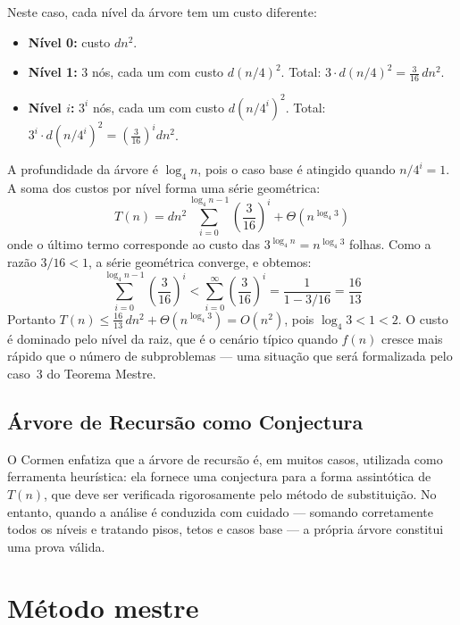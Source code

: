 \documentclass[9pt,a4paper]{extarticle}
\begin{document}
\noindent Neste caso, cada nível da árvore tem um custo diferente:

\begin{itemize}
    \item \textbf{Nível 0:} custo $dn^2$.
    \item \textbf{Nível 1:} $3$ nós, cada um com custo $d(n/4)^2$. Total: $3 \cdot d(n/4)^2 = \frac{3}{16}\,dn^2$.
    \item \textbf{Nível $i$:} $3^i$ nós, cada um com custo $d(n/4^i)^2$. Total: $3^i \cdot d(n/4^i)^2 = \left(\frac{3}{16}\right)^i dn^2$.
\end{itemize}

\noindent A profundidade da árvore é $\log_4 n$, pois o caso base é atingido quando $n/4^i = 1$. A soma dos custos por nível forma uma série geométrica:
%
\[
T(n) = dn^2 \sum_{i=0}^{\log_4 n - 1} \left(\frac{3}{16}\right)^i + \Theta\!\left(n^{\log_4 3}\right)
\]
%
\noindent onde o último termo corresponde ao custo das $3^{\log_4 n} = n^{\log_4 3}$ folhas. Como a razão $3/16 < 1$, a série geométrica converge, e obtemos:
%
\[
\sum_{i=0}^{\log_4 n - 1} \left(\frac{3}{16}\right)^i < \sum_{i=0}^{\infty} \left(\frac{3}{16}\right)^i = \frac{1}{1 - 3/16} = \frac{16}{13}
\]
%
\noindent Portanto $T(n) \leq \frac{16}{13}\,dn^2 + \Theta(n^{\log_4 3}) = O(n^2)$, pois $\log_4 3 < 1 < 2$. O custo é dominado pelo nível da raiz, que é o cenário típico quando $f(n)$ cresce mais rápido que o número de subproblemas --- uma situação que será formalizada pelo caso~3 do Teorema Mestre.

\subsection{Árvore de Recursão como Conjectura}

O Cormen enfatiza que a árvore de recursão é, em muitos casos, utilizada como ferramenta heurística: ela fornece uma conjectura para a forma assintótica de $T(n)$, que deve ser verificada rigorosamente pelo método de substituição. No entanto, quando a análise é conduzida com cuidado --- somando corretamente todos os níveis e tratando pisos, tetos e casos base --- a própria árvore constitui uma prova válida.

\section{Método mestre}

   

\end{document}
